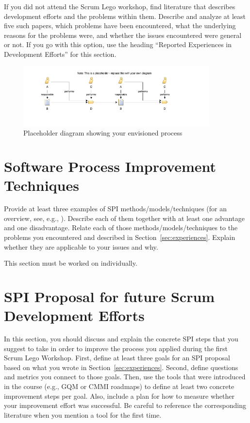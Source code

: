 \documentclass[conference]{IEEEtran}
\begin{document}
If you did not attend the Scrum Lego workshop, find literature that describes development efforts and the problems within them. Describe and analyze at least five such papers, which problems have been encountered, what the underlying reasons for the problems were, and whether the issues encountered were general or not. If you go with this option, use the heading ``Reported Experiences in Development Efforts'' for this section.


\begin{figure}
	\centering
	\includegraphics[width=0.9\textwidth]{placeholder_diagram}
	\caption{Placeholder diagram showing your envisioned process}
	\label{fig:placeholderdiagram}
\end{figure}
\section{Software Process Improvement Techniques}
\label{sec:spi-techniques}
Provide at least three examples of SPI methods/models/techniques (for an overview, see, e.g., \cite{Pettersson2008}). Describe each of them together with at least one advantage and one disadvantage.
Relate each of those methods/models/techniques to the problems you encountered and described in Section~\ref{sec:experiences}.
Explain whether they are applicable to your issues and why.

This section must be worked on individually.

\section{SPI Proposal for future Scrum Development Efforts}
\label{sec:proposal}
In this section, you should discuss and explain the concrete SPI steps that you suggest to take in order to improve the process you applied during the first Scrum Lego Workshop. First, define at least three goals for an SPI proposal based on what you wrote in Section~\ref{sec:experiences}. Second, define questions and metrics you connect to those goals.
Then, use the tools that were introduced in the course (e.g., GQM or CMMI roadmaps) to define at least two concrete improvement steps per goal. Also, include a plan for how to measure whether your improvement effort was successful. Be careful to reference the corresponding literature when you mention a tool for the first time.
\end{document}
